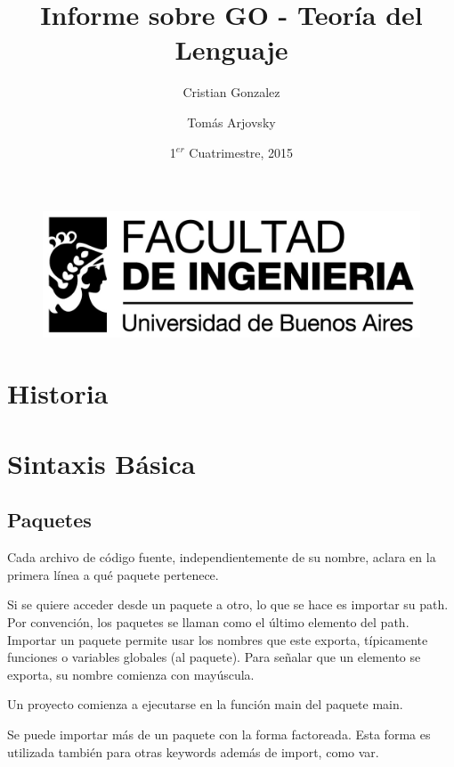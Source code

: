 \documentclass{article}
\begin{document}
\begin{figure}
	\centering
	\includegraphics[width=0.9\linewidth]{./logo_fiuba_alta}
	\label{fig:logo_fiuba_alta}
\end{figure}

\title{Informe sobre GO - Teoría del Lenguaje}
\author{Cristian Gonzalez \and Tomás Arjovsky}
\date{1$^{er}$ Cuatrimestre, 2015}
\maketitle
\newpage
\tableofcontents
\newpage
\section{Historia}
\section{Sintaxis Básica}
\subsection{Paquetes}
Cada archivo de código fuente, independientemente de su nombre, aclara en la primera línea a qué paquete pertenece.

Si se quiere acceder desde un paquete a otro, lo que se hace es importar su path. Por convención, los paquetes se llaman como el último elemento del path. Importar un paquete permite usar los nombres que este exporta, típicamente funciones o variables globales (al paquete). Para señalar que un elemento se exporta, su nombre comienza con mayúscula.

Un proyecto comienza a ejecutarse en la función main del paquete main.



Se puede importar más de un paquete con la forma factoreada. Esta forma es utilizada también para otras keywords además de import, como var.
\end{document}
